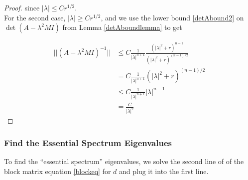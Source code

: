 \documentclass[thesis.tex]{subfiles}
\begin{document}
\begin{lemma}
\begin{proof}
since $|\lambda| \leq C r^{1/2}$.\\

For the second case, $|\lambda| \geq C r^{1/2}$, and we use the lower bound \eqref{detAbound2} on $\det(A - \lambda^2 M I)$ from Lemma \ref{detAboundlemma} to get

\begin{align*}
||(A - \lambda^2 M I)^{-1}|| &\leq C \frac{1}{|\lambda|^{n+1}} 
\frac{\left( |\lambda|^2 + r \right)^{n-1}}{\left( |\lambda|^2 + r \right)^{(n-1)/2}} \\
&= C \frac{1}{|\lambda|^{n+1}} \left( |\lambda|^2 + r \right)^{(n-1)/2} \\
&\leq C \frac{1}{|\lambda|^{n+1}} |\lambda|^{n-1} \\
&=\frac{C}{|\lambda|^2}
\end{align*}

\end{proof}
\end{lemma}

\subsubsection{Find the Essential Spectrum Eigenvalues}

To find the ``essential spectrum'' eigenvalues, we solve the second line of of the block matrix equation \eqref{blockeq} for $d$ and plug it into the first line.

\end{document}
